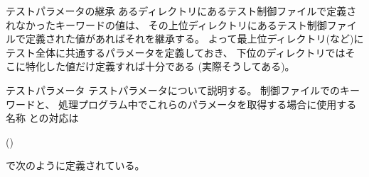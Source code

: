 \medskip
\begin{Description}{テストパラメータの継承}
	あるディレクトリにあるテスト制御ファイルで定義されなかったキーワードの値は、
	その上位ディレクトリにあるテスト制御ファイルで定義された値があればそれを継承する。
	よって最上位ディレクトリ(など)に
	テスト全体に共通するパラメータを定義しておき、
	下位のディレクトリではそこに特化した値だけ定義すれば十分である
	(実際そうしてある)。
\end{Description}

\medskip
\begin{Description}{テストパラメータ}
	テストパラメータについて説明する。
	制御ファイルでのキーワードと、
	処理プログラム中でこれらのパラメータを取得する場合に使用する名称
	との対応は
	\begin{narrow}
		 ()
	\end{narrow}
	で次のように定義されている。


\end{Description}
